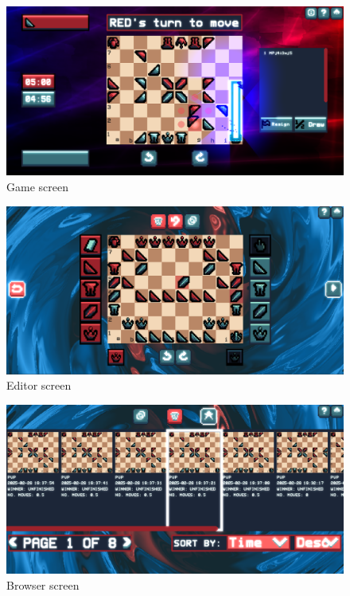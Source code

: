 \documentclass[../main/main.tex]{subfiles}
\begin{document}
\begin{figure}[H]
    \centering
    \includegraphics[width=\columnwidth]{../screenshots/assets/game.png}
    \caption{Game screen}
    \label{fig:screenshots-game}
\end{figure}

\begin{figure}[H]
    \centering
    \includegraphics[width=\columnwidth]{../screenshots/assets/editor.png}
    \caption{Editor screen}
    \label{fig:screenshots-editor}
\end{figure}

\begin{figure}[H]
    \centering
    \includegraphics[width=\columnwidth]{../screenshots/assets/browser.png}
    \caption{Browser screen}
    \label{fig:screenshots-browser}
\end{figure}
\end{document}
